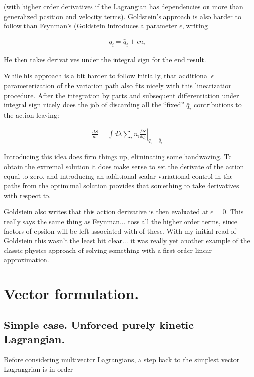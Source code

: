 \documentclass{article}
\newcommand{\qbar}[0]{\bar{q}}
\begin{document}
(with higher order derivatives if the Lagrangian has dependencies on more than generalized position and velocity terms).  Goldstein's 
approach is also harder to follow than Feynman's (Goldstein introduces a parameter $\epsilon$, writing

\begin{align}\label{eqn:epsilonvariation}
q_i = \qbar_i + \epsilon n_i
\end{align}

He then takes derivatives under the integral sign for the end result.

While his approach is a bit harder to follow initially, that additional $\epsilon$ parameterization of the variation path also fits nicely with this
linearization procedure.
After the integration by parts and subsequent differentiation under integral sign nicely does the job of
discarding all the ``fixed'' $\qbar_i$ contributions to the action leaving:

\begin{align*}
\frac{dS}{d\epsilon} = \int d\lambda \sum_i n_i \left. \frac{\delta S}{\delta q_i} \right\vert_{q_i = \qbar_i}
\end{align*}

Introducing this idea does firm things up, eliminating some handwaving.  To obtain the extremal solution it does
make sense to set the derivate of the action equal to zero, and introducing an additional scalar variational control
in the paths from the optimimal solution provides that something to take derivatives with respect to.

Goldstein also writes that this action derivative is then evaluated at $\epsilon = 0$.  This really says the same
thing as Feynman... toss all the higher order terms, since factors of epsilon will be left associated with of these.
With my initial read of Goldstein this wasn't the least bit clear... it was really yet another example of the classic
physics approach of solving something with a first order linear approximation.

\section{ Vector formulation. }

\subsection{ Simple case.  Unforced purely kinetic Lagrangian. }

Before considering multivector Lagrangians, a step back to the simplest vector Lagrangrian is in order
\end{document}
